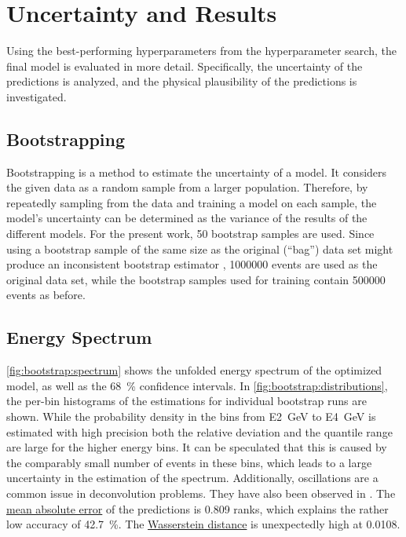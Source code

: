 \section{Uncertainty and Results}
Using the best-performing hyperparameters from the hyperparameter search, %
the final model is evaluated in more detail.
Specifically,
  the uncertainty of the predictions is analyzed, %
  and the physical plausibility of the predictions is investigated.


\subsection{Bootstrapping}
Bootstrapping \cite{bootstrap} is a method to estimate the uncertainty of a model.
It considers the given data as a random sample from a larger population.
Therefore,
by repeatedly sampling from the data and training a model on each sample,
the model's uncertainty can be determined
as the variance of the results of the different models.
%
For the present work, \num{50} bootstrap samples are used.
Since using a bootstrap sample of the same size as the original (\enquote{bag}) data set
might produce an inconsistent bootstrap estimator \cite{bootstrap_samplesize},
\num{1000000} events are used as the original data set,
while the bootstrap samples used for training contain \num{500000} events as before.


\subsection{Energy Spectrum}
\autoref{fig:bootstrap:spectrum} shows the unfolded energy spectrum of the optimized model,
as well as the \SI{68}{\percent} confidence intervals.
In \autoref{fig:bootstrap:distributions},
the per-bin histograms of the estimations for individual bootstrap runs are shown.
While the probability density in the bins from \SI{E2}{\giga\electronvolt} to \SI{E4}{\giga\electronvolt} is estimated with high precision
both the relative deviation and the quantile range are large for the higher energy bins.
It can be speculated that this is caused by the comparably small number of events in these bins,
which leads to a large uncertainty in the estimation of the spectrum.
Additionally,
oscillations are a common issue in deconvolution problems.
They have also been observed in \cite{dsea_samuel}.
%
The \hyperref[sec:unfolding:metrics:mae]{mean absolute error} of the predictions is \num{0.809} ranks,
  which explains the rather low accuracy of \SI{42.7}{\percent}.
The \hyperref[sec:unfolding:metrics:wasserstein]{Wasserstein distance}
is unexpectedly high at \num{0.0108}.

